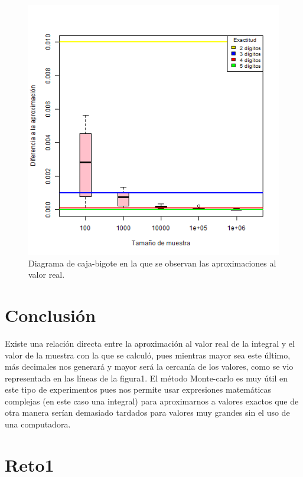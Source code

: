 \documentclass{article}
\begin{document}
\begin{figure}
  \centering\includegraphics[scale=0.7]{Grafica1.png}
  \caption{Diagrama de caja-bigote en la que se observan las aproximaciones al valor real.}
  \label{fig}
\end{figure}

\newpage

\section{Conclusi\'on}

Existe una relaci\'on directa entre la aproximaci\'on al valor real de la integral y el valor de la muestra con la que se calcul\'o, pues mientras mayor sea este \'ultimo, m\'as decimales nos generar\'a y mayor ser\'a la cercan\'ia de los valores, como se vio representada en las l\'ineas de la figura1.  El m\'etodo Monte-carlo es muy \'util en este tipo de experimentos pues nos permite usar expresiones matem\'aticas complejas (en este caso una integral) para aproximarnos a valores exactos que de otra manera ser\'ian demasiado tardados para valores muy grandes sin el uso de una computadora.

\section{Reto1}
\end{document}
